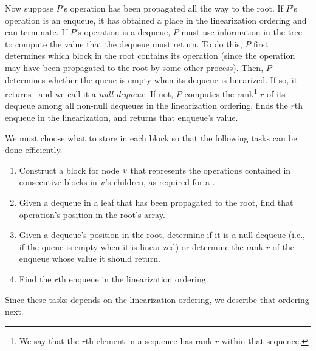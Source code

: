 Now suppose $P$'s operation has been propagated all the way to the root.
If $P$'s operation is an enqueue, it has obtained a place in the linearization ordering and can terminate.
If $P$'s operation is a dequeue, $P$ must use information in the tree to compute the value that the
dequeue must return.  To do this, $P$ first determines which block in the root contains its operation
(since the operation may have been propagated to the root by some other process).
Then, $P$ determines whether the queue is empty when its dequeue is linearized. 
If so, it returns \nl\ and we call it a \emph{null dequeue}.
If not, $P$ computes the rank\footnote{We say that the $r$th element in a sequence has rank $r$ within that sequence.} $r$ of its dequeue among all non-null dequeues in the linearization ordering,
finds the $r$th enqueue in the linearization, and returns that enqueue's value.

We must choose what to store in each block so that the following tasks can be done efficiently.
\begin{enumerate}[label={(T\arabic*)}]
\item
\label{construct}
Construct a block for node $\mbox{\textnormal{\textit{v}}}$ that represents the operations contained in consecutive blocks in $\mbox{\textnormal{\textit{v}}}$'s children, as required for a .
\item
\label{findinroot}
Given a dequeue in a leaf that has been propagated to the root, find that operation's position in the root's  array.
\item
\label{findrank}
Given a dequeue's position in the root, determine if it is a null dequeue (i.e., if the queue is empty when it is linearized)
or determine the rank $r$ of the enqueue whose value it should return.
\item
\label{findenqueue}
Find the $r$th enqueue in the linearization ordering.
\end{enumerate}
Since these tasks depends on the linearization ordering, we describe that ordering next.

